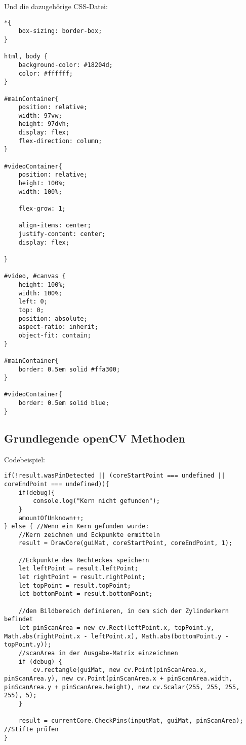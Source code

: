 \documentclass{article}
\begin{document}
Und die dazugehörige CSS-Datei:

\begin{lstlisting}[style=CSS]
*{
    box-sizing: border-box;
}

html, body {
    background-color: #18204d;
    color: #ffffff;
}

#mainContainer{
    position: relative;
    width: 97vw;
    height: 97dvh;
    display: flex;
    flex-direction: column;
}

#videoContainer{
    position: relative;
    height: 100%;
    width: 100%;

    flex-grow: 1;

    align-items: center;
    justify-content: center;
    display: flex;

}

#video, #canvas {
    height: 100%;
    width: 100%;
    left: 0;
    top: 0;
    position: absolute;
    aspect-ratio: inherit;
    object-fit: contain;
}

#mainContainer{
    border: 0.5em solid #ffa300;
}

#videoContainer{
    border: 0.5em solid blue;
}
\end{lstlisting}

\subsection{Grundlegende openCV Methoden}
Codebeispiel:

\begin{lstlisting}[style=JavaScript]
if(!result.wasPinDetected || (coreStartPoint === undefined || coreEndPoint === undefined)){
    if(debug){
        console.log("Kern nicht gefunden");
    }
    amountOfUnknown++;
} else { //Wenn ein Kern gefunden wurde:
    //Kern zeichnen und Eckpunkte ermitteln
    result = DrawCore(guiMat, coreStartPoint, coreEndPoint, 1);

    //Eckpunkte des Rechteckes speichern
    let leftPoint = result.leftPoint;
    let rightPoint = result.rightPoint;
    let topPoint = result.topPoint;
    let bottomPoint = result.bottomPoint;

    //den Bildbereich definieren, in dem sich der Zylinderkern befindet
    let pinScanArea = new cv.Rect(leftPoint.x, topPoint.y, Math.abs(rightPoint.x - leftPoint.x), Math.abs(bottomPoint.y - topPoint.y));
    //scanArea in der Ausgabe-Matrix einzeichnen
    if (debug) {
        cv.rectangle(guiMat, new cv.Point(pinScanArea.x, pinScanArea.y), new cv.Point(pinScanArea.x + pinScanArea.width, pinScanArea.y + pinScanArea.height), new cv.Scalar(255, 255, 255, 255), 5);
    }

    result = currentCore.CheckPins(inputMat, guiMat, pinScanArea); //Stifte prüfen
}
\end{lstlisting}
\end{document}
